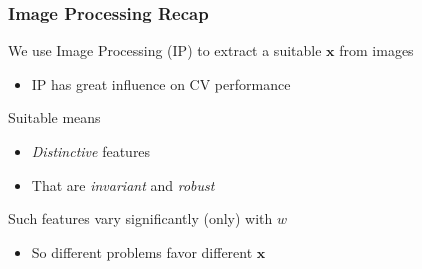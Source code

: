 \documentclass[xetex,professionalfont]{beamer}
\renewcommand{\vec}[1]{\ensuremath{\mathbf{#1}}}
\newcommand{\vx}{\vec{x}}
\begin{document}

{
\begin{frame}



\end{frame}
}


\begin{frame}
\frametitle{Image Processing Recap}

We use Image Processing (IP) to extract a suitable $\vx$ from images
\begin{itemize}
    \item IP has great influence on CV performance
\end{itemize}

\bigskip
Suitable means
\begin{itemize}
    \item \emph{Distinctive} features %
    \item That are \emph{invariant} and \emph{robust}
\end{itemize}

\bigskip
Such features vary significantly (only) with $w$
\begin{itemize}
    \item So different problems favor different $\vx$
\end{itemize}

\end{frame}
\end{document}
